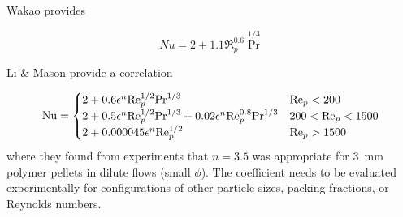 












Wakao provides

\begin{equation}
	Nu = 2 + 1.1\Re_p^{0.6} \Pr^{1/3}
\end{equation}






Li \& Mason provide a correlation 

\begin{equation}\label{eq:li-mason-correlation}
	\mathrm{Nu} = \begin{cases}
	2+ 0.6\epsilon^n\mathrm{Re}_p^{1/2}\mathrm{Pr}^{1/3} 										& \mathrm{Re}_p < 200\\
	2+ 0.5\epsilon^n\mathrm{Re}_p^{1/2}\mathrm{Pr}^{1/3} + 0.02 \epsilon^n \mathrm{Re}_p^{0.8}\mathrm{Pr}^{1/3} & 200 < \mathrm{Re}_p < 1500\\
	2+ 0.000045\epsilon^n\mathrm{Re}_p^{1/2}			 								& \mathrm{Re}_p > 1500
	\end{cases}
\end{equation}
where they found from experiments that $n=3.5$ was appropriate for 3~mm polymer pellets in dilute flows (small $\phi$). The coefficient needs to be evaluated experimentally for configurations of other particle sizes, packing fractions, or Reynolds numbers.\cite{Li2000}

